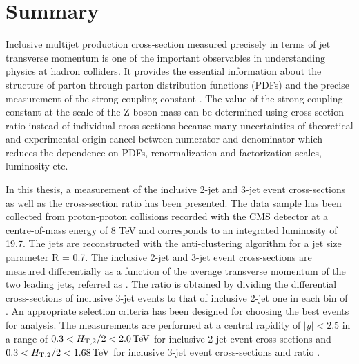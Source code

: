 \chapter{Summary}
\label{chap:Summary}
Inclusive multijet production cross-section measured precisely in terms of jet transverse momentum is one of the important observables in understanding physics at hadron colliders. It provides the essential information about the structure of parton through parton distribution functions (PDFs) and the precise measurement of the strong coupling constant \alps. The value of the strong coupling constant at the scale of the Z boson mass \alpsmz can be determined using cross-section ratio instead of individual cross-sections because many uncertainties of theoretical and experimental origin cancel between numerator and denominator which reduces the dependence on PDFs, renormalization and factorization scales, luminosity etc.

In this thesis, a measurement of the inclusive 2-jet and 3-jet event cross-sections as well as the cross-section ratio \ratio has been presented. The data sample has been collected from proton-proton collisions recorded with the CMS detector at a centre-of-mass energy of 8 TeV and corresponds to an integrated luminosity of 19.7\fbinv. The jets are reconstructed with the anti-\kt clustering algorithm for a jet size parameter R = 0.7. The inclusive 2-jet and 3-jet event cross-sections are measured differentially as a function of the average transverse momentum of the two leading jets, referred as \httwo. The ratio \ratio is obtained by dividing the differential cross-sections of inclusive 3-jet events to that of inclusive 2-jet one in each bin of \httwo. An appropriate selection criteria has been designed for choosing the best
events for analysis. The measurements are performed at a central rapidity of $|y|<2.5$ in a range of $0.3 < H_{\mathrm{T,2}}/2 < 2.0\,\text{Te\hspace{-.08em}V}$ for inclusive 2-jet event cross-sections and $0.3 < H_{\mathrm{T,2}}/2 < 1.68\,\text{Te\hspace{-.08em}V}$ for inclusive 3-jet event cross-sections and ratio \ratio. 

